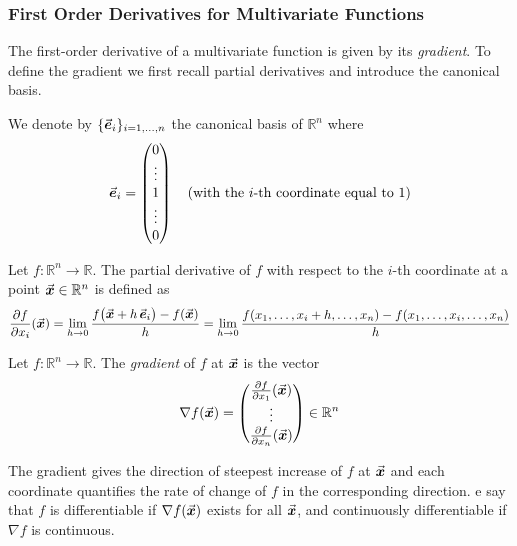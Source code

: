 

\subsubsection{First Order Derivatives for Multivariate Functions}
The first-order derivative of a multivariate function is given by its \emph{gradient}. To define the gradient we first recall partial derivatives and introduce the canonical basis.

We denote by \(\{\vec{\boldsymbol{e}}_{i}\}_{i=1,\ldots,n}\) the canonical basis of \(\mathbb{R}^{n}\) where
\[
\vec{\boldsymbol{e}}_{i}=\begin{pmatrix}
0\\
\vdots\\
1\\
\vdots\\
0
\end{pmatrix}\quad \text{(with the \(i\)-th coordinate equal to 1)}
\]

\begin{definition}\label{def:partial_derivative}
Let \(f:\mathbb{R}^{n}\to\mathbb{R}\). The partial derivative of \(f\) with respect to the \(i\)-th coordinate at a point \(\vec{\boldsymbol{x}}\in\mathbb{R}^{n}\) is defined as
\[
\frac{\partial f}{\partial x_{i}}(\vec{\boldsymbol{x}})
=\lim_{h\to0}\frac{f\bigl(\vec{\boldsymbol{x}}+h\,\vec{\boldsymbol{e}}_{i}\bigr)-f(\vec{\boldsymbol{x}})}{h}
=\lim_{h\to0}\frac{f(x_{1},\ldots,x_{i}+h,\ldots,x_{n})-f(x_{1},\ldots,x_{i},\ldots,x_{n})}{h}
\]
\end{definition}

\begin{definition}[Gradient]\label{def:gradient}
Let \(f:\mathbb{R}^{n}\to\mathbb{R}\). The \emph{gradient} of \(f\) at \(\vec{\boldsymbol{x}}\) is the vector
\[
\nabla f(\vect{x})
=\begin{pmatrix}
\frac{\partial f}{\partial x_{1}}(\vect{x})\\%
\vdots\\%
\frac{\partial f}{\partial x_{n}}(\vect{x})
\end{pmatrix}\in\mathbb{R}^{n}
\]
\end{definition}
The gradient gives the direction of steepest increase of \(f\) at \(\vec{\boldsymbol{x}}\) and each coordinate quantifies the rate of change of \(f\) in the corresponding direction.
e say that \(f\) is differentiable if \(\nabla f(\vec{\boldsymbol{x}})\) exists for all \(\vec{\boldsymbol{x}}\), and continuously differentiable if \(\nabla f\) is continuous.

